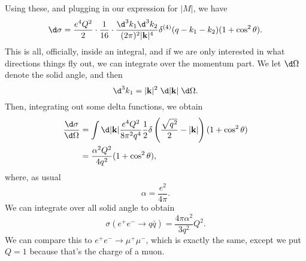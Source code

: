 \documentclass[a4paper]{article}
\begin{document}
Using these, and plugging in our expression for $|M|$, we have
\[
  \d \sigma = \frac{e^4 Q^2}{2} \cdot \frac{1}{16} \cdot \frac{\d^3 k_1 \d^3 k_2}{(2\pi)^2|\mathbf{k}|^4} \delta^{(4)} (q - k_1 - k_2) (1 + \cos^2\theta).
\]
This is all, officially, inside an integral, and if we are only interested in what directions things fly out, we can integrate over the momentum part. We let $\d \Omega$ denote the solid angle, and then
\[
  \d^3 k_1 = |\mathbf{k}|^2 \;\d |\mathbf{k}|\;\d \Omega.
\]
Then, integrating out some delta functions, we obtain
\begin{align*}
  \frac{\d \sigma}{\d \Omega} &= \int \d|\mathbf{k}| \frac{e^4 Q^2}{8 \pi^2 q^4} \frac{1}{2} \delta\left(\frac{\sqrt{q^2}}{2} - |\mathbf{k}|\right)(1 + \cos^2 \theta)\\
  &= \frac{\alpha^2 Q^2}{4 q^2} (1 + \cos^2 \theta),
\end{align*}
where, as usual
\[
  \alpha = \frac{e^2}{4\pi}.
\]
We can integrate over all solid angle to obtain
\[
  \sigma(e^+ e^- \to q \bar{q}) = \frac{4\pi \alpha^2}{3 q^2}Q^2.
\]
We can compare this to $e^+ e^- \to \mu^+ \mu^-$, which is exactly the same, except we put $Q = 1$ because that's the charge of a muon.
\end{document}

